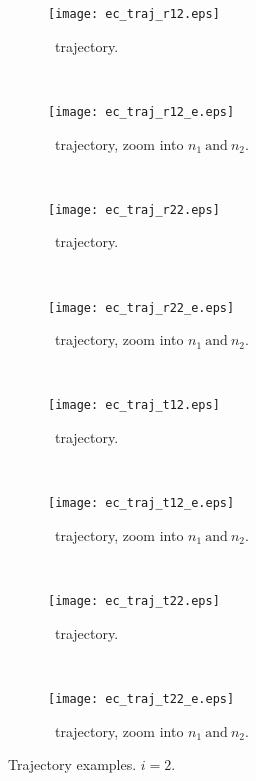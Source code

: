 \begin{figure}
\vspace{-5mm}
\begin{subfigure}[t]{0.5\textwidth}
\centering
\texttt{[image: ec\_traj\_r12.eps]}
\caption[Extended coupling: \rot~trajectory.]{\rot~trajectory.}
\label{sf:ecr12}
\end{subfigure}
~
\begin{subfigure}[t]{0.5\textwidth}
\centering
\texttt{[image: ec\_traj\_r12\_e.eps]}
\caption[Extended coupling: \rot~trajectory, zoom into $ n_{1}~\text{and}~n_{2} $.]{\rot~trajectory, zoom into $ n_{1}~\text{and}~n_{2} $.}
\label{sf:ecr12e}
\end{subfigure}
\\[-1mm]
\begin{subfigure}[t]{0.5\textwidth}
\centering
\texttt{[image: ec\_traj\_r22.eps]}
\caption[Extended coupling: \rtt~trajectory.]{\rtt~trajectory.}
\label{sf:ecr22}
\end{subfigure}
~
\begin{subfigure}[t]{0.5\textwidth}
\centering
\texttt{[image: ec\_traj\_r22\_e.eps]}
\caption[Extended coupling: \rtt~trajectory, zoom into $ n_{1}~\text{and}~n_{2} $.]{\rtt~trajectory, zoom into $ n_{1}~\text{and}~n_{2} $.}
\label{sf:ecr22e}
\end{subfigure}
\\[-1mm]
\begin{subfigure}[t]{0.5\textwidth}
\centering
\texttt{[image: ec\_traj\_t12.eps]}
\caption[Extended coupling: \tot~trajectory.]{\tot~trajectory.}
\label{sf:ect12}
\end{subfigure}
~
\begin{subfigure}[t]{0.5\textwidth}
\centering
\texttt{[image: ec\_traj\_t12\_e.eps]}
\caption[Extended coupling: \tot~trajectory, zoom into $ n_{1}~\text{and}~n_{2} $.]{\tot~trajectory, zoom into $ n_{1}~\text{and}~n_{2} $.}
\label{sf:ect12e}
\end{subfigure}
\\[-1mm]
\begin{subfigure}[t]{0.5\textwidth}
\centering
\texttt{[image: ec\_traj\_t22.eps]}
\caption[Extended coupling: \ttt~trajectory.]{\ttt~trajectory.}
\label{sf:ect22}
\end{subfigure}
~
\begin{subfigure}[t]{0.5\textwidth}
\centering
\texttt{[image: ec\_traj\_t22\_e.eps]}
\caption[Extended coupling: \ttt~trajectory, zoom into $ n_{1}~\text{and}~n_{2} $.]{\ttt~trajectory, zoom into $ n_{1}~\text{and}~n_{2} $.}
\label{sf:ect22e}
\end{subfigure}
\vspace{-3mm}
\caption[Extended coupling: trajectory examples. $ i = 2 $]{Trajectory examples. $ i = 2 $.}
\label{f:ec2t}
\end{figure}
%
